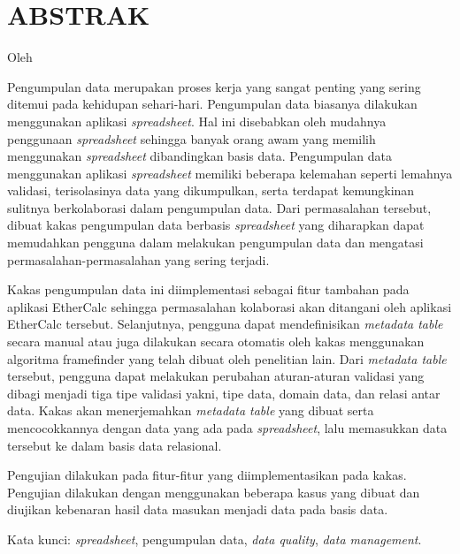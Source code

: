 \clearpage
\chapter*{ABSTRAK}
\begin{center}
\MakeTextUppercase{\textbf{\large{\thetitle}}}

Oleh

\MakeTextUppercase{\theauthor}
\end{center}
\medskip
\begin{spacing}{1.0}
Pengumpulan data merupakan proses kerja yang sangat penting yang sering ditemui pada kehidupan sehari-hari. Pengumpulan data biasanya dilakukan menggunakan aplikasi \textit{spreadsheet}. Hal ini disebabkan oleh mudahnya penggunaan \textit{spreadsheet} sehingga banyak orang awam yang memilih menggunakan \textit{spreadsheet} dibandingkan basis data. Pengumpulan data menggunakan aplikasi \textit{spreadsheet} memiliki beberapa kelemahan seperti lemahnya validasi, terisolasinya data yang dikumpulkan, serta terdapat kemungkinan sulitnya berkolaborasi dalam pengumpulan data. Dari permasalahan tersebut, dibuat kakas pengumpulan data berbasis \textit{spreadsheet} yang diharapkan dapat memudahkan pengguna dalam melakukan pengumpulan data dan mengatasi permasalahan-permasalahan yang sering terjadi.

Kakas pengumpulan data ini diimplementasi sebagai fitur tambahan pada aplikasi EtherCalc sehingga permasalahan kolaborasi akan ditangani oleh aplikasi EtherCalc tersebut. Selanjutnya, pengguna dapat mendefinisikan \textit{metadata table} secara manual atau juga dilakukan secara otomatis oleh kakas menggunakan algoritma framefinder yang telah dibuat oleh penelitian lain. Dari \textit{metadata table} tersebut, pengguna dapat melakukan perubahan aturan-aturan validasi yang dibagi menjadi tiga tipe validasi yakni, tipe data, domain data, dan relasi antar data. Kakas akan menerjemahkan \textit{metadata table} yang dibuat serta mencocokkannya dengan data yang ada pada \textit{spreadsheet}, lalu memasukkan data tersebut ke dalam basis data relasional.

Pengujian dilakukan pada fitur-fitur yang diimplementasikan pada kakas. Pengujian dilakukan dengan menggunakan beberapa kasus yang dibuat dan diujikan kebenaran hasil data masukan menjadi data pada basis data.

Kata kunci: \textit{spreadsheet}, pengumpulan data, \textit{data quality}, \textit{data management}.
\end{spacing}

\clearpage